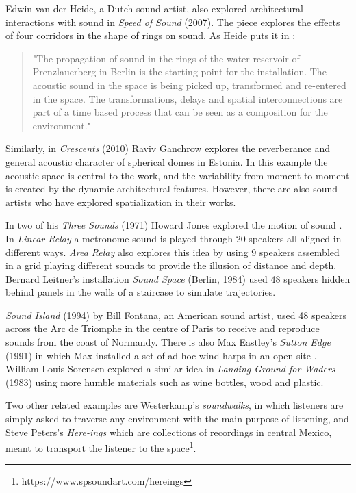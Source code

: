 Edwin van der Heide, a Dutch sound artist, also explored architectural interactions with sound in \textit{Speed of Sound} (2007). The piece explores the effects of four corridors in the shape of rings on sound. As Heide puts it in \cite{TheSpeed60online}:

\begin{quote}
    "The propagation of sound in the rings of the water reservoir of Prenzlauerberg in Berlin is the starting point for the installation. The acoustic sound in the space is being picked up, transformed and re-entered in the space. The transformations, delays and spatial interconnections are part of a time based process that can be seen as a composition for the environment."
\end{quote}

Similarly, in \textit{Crescents} (2010) Raviv Ganchrow explores the reverberance and general acoustic character of spherical domes in Estonia. In this example the acoustic space is central to the work, and the variability from moment to moment is created by the dynamic architectural features. However, there are also sound artists who have explored spatialization in their works. 

In two of his \textit{Three Sounds} (1971) Howard Jones explored the motion of sound \cite{macedo2015investigating}. In \textit{Linear Relay} a metronome sound is played through 20 speakers all aligned in different ways. \textit{Area Relay} also explores this idea by using 9 speakers assembled in a grid playing different sounds to provide the illusion of distance and depth. Bernard Leitner's installation \textit{Sound Space} (Berlin, 1984) used 48 speakers hidden behind panels in the walls of a staircase to simulate trajectories.  

\textit{Sound Island} (1994) by Bill Fontana, an American sound artist, used 48 speakers across the Arc de Triomphe in the centre of Paris to receive and reproduce sounds from the coast of Normandy. There is also Max Eastley's \textit{Sutton Edge} (1991) in which Max installed a set of ad hoc wind harps in an open site \cite{ray2006soundscapes}. William Louis Sorensen explored a similar idea in \textit{Landing Ground for Waders} (1983) using more humble materials such as wine bottles, wood and plastic. 

Two other related examples are Westerkamp's \textit{soundwalks}, in which listeners are simply asked to traverse any environment with the main purpose of listening, and Steve Peters’s \textit{Here-ings} which are collections of recordings in central Mexico, meant to transport the listener to the space\footnote{https://www.spsoundart.com/hereings}. 


